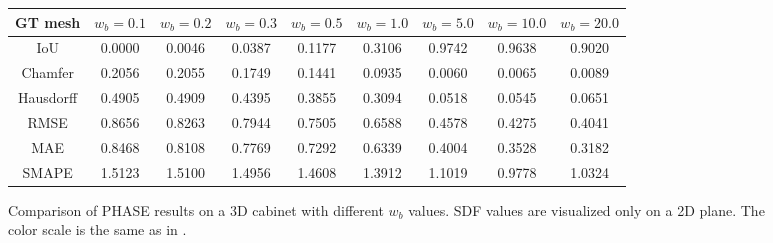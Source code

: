 \begin{figure}[t]
\begin{tabular}{ccccccccc}
        GT mesh & $w_b = 0.1$ & $w_b = 0.2$ & $w_b = 0.3$ & $w_b = 0.5$ & $w_b = 1.0$ & $w_b = 5.0$ & $w_b = 10.0$ & $w_b = 20.0$ \\
        \toprule
        IoU & 0.0000 & 0.0046 & 0.0387 & 0.1177 & 0.3106 & 0.9742 & 0.9638 & 0.9020 \\
        Chamfer & 0.2056 & 0.2055 & 0.1749 & 0.1441 & 0.0935 & 0.0060 & 0.0065 & 0.0089 \\
        Hausdorff & 0.4905 & 0.4909 & 0.4395 & 0.3855 & 0.3094 & 0.0518 & 0.0545 & 0.0651 \\
        RMSE & 0.8656 & 0.8263 & 0.7944 & 0.7505 & 0.6588 & 0.4578 & 0.4275 & 0.4041 \\
        MAE & 0.8468 & 0.8108 & 0.7769 & 0.7292 & 0.6339 & 0.4004 & 0.3528 & 0.3182 \\
        SMAPE & 1.5123 & 1.5100 & 1.4956 & 1.4608 & 1.3912 & 1.1019 & 0.9778 & 1.0324 \\
        \bottomrule
    \end{tabular}
    \caption{Comparison of PHASE results on a 3D cabinet with different $w_b$ values. SDF values are visualized only on a 2D plane. The color scale is the same as in .}
    \label{fig:phase-boundary-weight-3d}
\end{figure}

